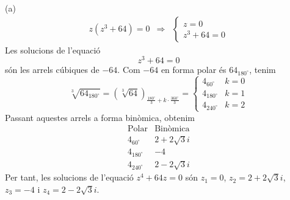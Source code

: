 \begin{solucio}
(a)
\[
\begin{array}{lll}
z(z^{3}+64)=0 & \Longrightarrow & \left\{
\begin{array}{l}
z=0 \\
z^{3}+64=0
\end{array}
\right.
\end{array}
\]
Les solucions de l’equació
\[
z^{3}+64=0
\]
són les arrels cúbiques de $-64$. Com $-64$ en forma polar és $
64_{180
^{\circ}
}$, tenim
\[
\sqrt[3]{64_{180
^{\circ}
}}=\left( \sqrt[3]{64}\right) _{\frac{180
^{\circ}
}{3}+k\cdot \frac{360
^{\circ}
}{3}}=\left\{
\begin{array}{ll}
4_{60
^{\circ}
} & k=0 \\
4_{180
^{\circ}
} & k=1 \\
4_{240
^{\circ}
} & k=2
\end{array}
\right.
\]
Passant aquestes arrels a forma binòmica, obtenim
\[
\begin{array}{ll}
\text{Polar} & \text{Binòmica} \\
4_{60
^{\circ}
} & 2+2\sqrt{3}i \\
4_{180
^{\circ}
} & -4 \\
4_{240
^{\circ}
} & 2-2\sqrt{3}i
\end{array}
\]
Per tant, les solucions de l’equació $z^{4}+64z=0$ són $
z_{1}=0$, $z_{2}=2+2\sqrt{3}i$, $z_{3}=-4$ i $z_{4}=2-2\sqrt{3}i$.


\end{solucio}
